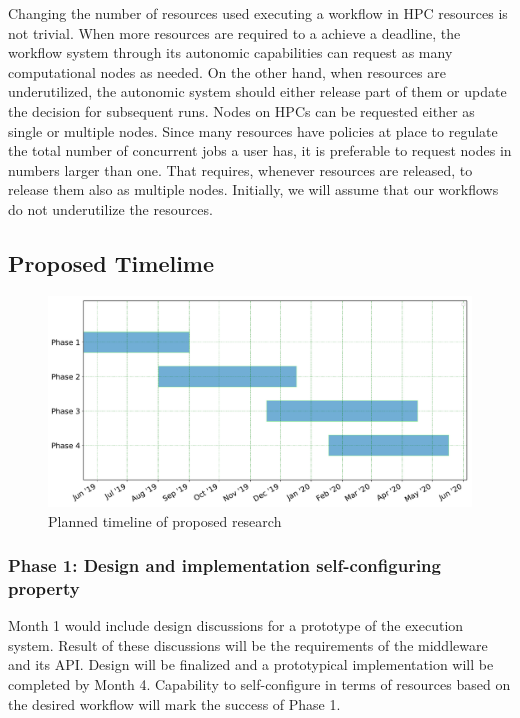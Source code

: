 Changing the number of resources used executing a workflow in HPC resources is not
trivial. When more resources are required to a achieve a deadline, the workflow system
through its autonomic capabilities can request as many computational nodes as needed. 
On the other hand, when resources are underutilized, the autonomic system should either
release part of them or update the decision for subsequent runs. Nodes on HPCs can be
requested either as single or multiple nodes. Since many resources have policies at place
to regulate the total number of concurrent jobs a user has, it is preferable to request
nodes in numbers larger than one. That requires, whenever resources are released, to
release them also as multiple nodes. Initially, we will assume that our workflows do not
underutilize the resources.


\subsection{Proposed Timelime}
\begin{figure}[t]
	\centering
	\includegraphics[width=.95\textwidth]{./phd_plan.pdf}
	\caption{Planned timeline of proposed research}\label{tab:work_plan}
\end{figure}

\subsubsection{Phase 1: Design and implementation self-configuring property}

Month 1 would include design discussions for a prototype of the execution system. 
Result of these discussions will be the requirements of the middleware and its 
API. Design will be finalized and a prototypical implementation will be completed 
by Month 4. Capability to self-configure in terms of resources based on the desired 
workflow will mark the success of Phase 1.

